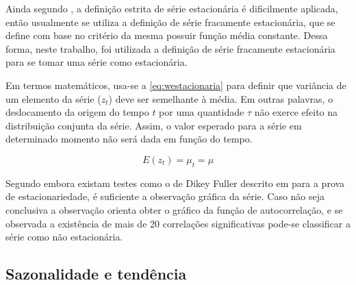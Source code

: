\documentclass[
    12pt,
    oneside,
    a4paper,
    english,
    brazil
]{abntex2}
\begin{document}
Ainda segundo , a definição  estrita de série estacionária é
dificilmente  aplicada,  então  usualmente  se utiliza  a  definição  de  série
fracamente estacionária,  que se define com  base no critério da  mesma possuir
função média constante. Dessa forma,  neste trabalho, foi utilizada a definição
de série fracamente estacionária para se tomar uma série como estacionária.

Em  termos matemáticos,  usa-se a  \autoref{eq:westacionaria} para  definir que
variância  de um  elemento da  série ($z_t$)  deve ser  semelhante à  média. Em
outras  palavras, o  deslocamento da  origem do  tempo $t$  por uma  quantidade
$\tau$ não  exerce efeito  na distribuição  conjunta da  série. Assim,  o valor
esperado para a série em determinado momento não será dada em função do tempo.

\begin{equation}
    \label{eq:westacionaria}
    E(z_t) = \mu_t = \mu
\end{equation}






Segundo   embora existam testes  como o  de Dikey
Fuller  descrito  em    para a  prova  de  estacionariedade,
é  suficiente  a observação  gráfica  da  série.  Caso  não seja  conclusiva  a
observação  orienta obter  o gráfico da função de
autocorrelação,  e  se  observada  a  existência  de  mais  de  20  correlações
significativas pode-se classificar a série como não estacionária.

\subsection{Sazonalidade e tendência}
\end{document}
